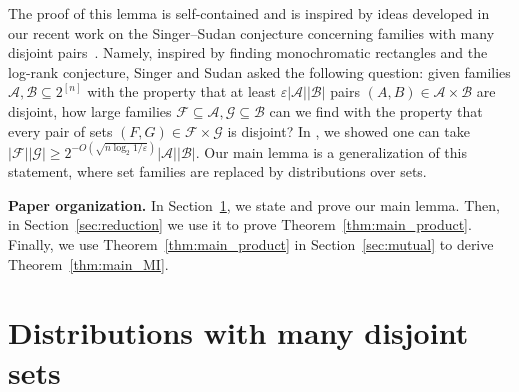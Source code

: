 \documentclass[11pt]{amsart}
\theoremstyle{definition}
\def\eps{\varepsilon}
\def\cA{\mathcal{A}}
\def\cB{\mathcal{B}}
\def\cF{\mathcal{F}}
\def\cG{\mathcal{G}}
\begin{document}
The proof of this lemma is self-contained and is inspired by ideas developed in our recent work on the Singer--Sudan conjecture concerning families with many disjoint pairs~\cite{HMST}. Namely, inspired by finding monochromatic rectangles and the log-rank conjecture, Singer and Sudan \cite{SS22} asked the following question: given families $\cA, \cB \subseteq 2^{[n]}$ with the property that at least $\eps |\cA||\cB|$ pairs $(A, B)\in \cA\times \cB$ are disjoint, how large families $\cF\subseteq \cA, \cG\subseteq \cB$ can we find with the property that every pair of sets $(F, G) \in \cF \times \cG$ is disjoint? In \cite{HMST}, we showed one can take $|\cF||\cG|\geq 2^{-O(\sqrt{n \log_2 1/\eps})}|\cA||\cB|$. Our main lemma is a generalization of this statement, where set families are replaced by distributions over sets.

\medskip\noindent
\textbf{Paper organization.} In Section~\ref{sec:disjoint}, we state and prove our main lemma. Then, in Section~\ref{sec:reduction} we use it to prove Theorem~\ref{thm:main_product}. Finally, we use Theorem~\ref{thm:main_product} in Section~\ref{sec:mutual} to derive Theorem~\ref{thm:main_MI}.

\section{Distributions with many disjoint sets}\label{sec:disjoint}
\end{document}
